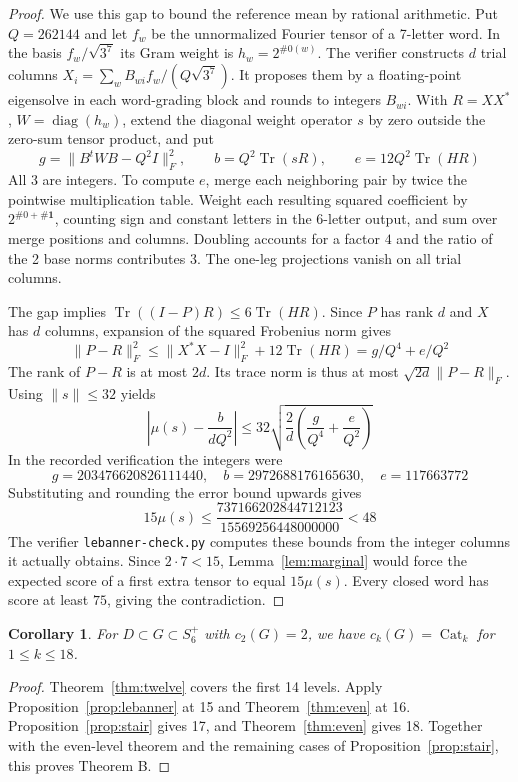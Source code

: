 \documentclass[11pt,a4paper]{amsart}
\newtheorem{corollary}[theorem]{Corollary}
\newcommand{\Cat}{\operatorname{Cat}}
\newcommand{\Tr}{\operatorname{Tr}}
\begin{document}
\begin{proof}
We use this gap to bound the reference mean by rational arithmetic. Put $Q=262144$ and let $f_w$ be the unnormalized Fourier tensor of a 7-letter word. In the basis $f_w/\sqrt{3^7}$ its Gram weight is $h_w=2^{\#0(w)}$. The verifier constructs $d$ trial columns $X_i=\sum_w B_{wi}f_w/(Q\sqrt{3^7})$. It proposes them by a floating-point eigensolve in each word-grading block and rounds to integers $B_{wi}$. With $R=XX^*$, $W=\operatorname{diag}(h_w)$, extend the diagonal weight operator $s$ by zero outside the zero-sum tensor product, and put
\[
 g=\|B^tWB-Q^2I\|_{F}^2,\qquad b=Q^2\Tr(sR),\qquad e=12Q^2\Tr(HR)
\]
All 3 are integers. To compute $e$, merge each neighboring pair by twice the pointwise multiplication table. Weight each resulting squared coefficient by $2^{\#0+\#\mathbf1}$, counting sign and constant letters in the 6-letter output, and sum over merge positions and columns. Doubling accounts for a factor $4$ and the ratio of the 2 base norms contributes $3$. The one-leg projections vanish on all trial columns.

The gap implies $\Tr((I-P)R)\leq6\Tr(HR)$. Since $P$ has rank $d$ and $X$ has $d$ columns, expansion of the squared Frobenius norm gives
\[
 \|P-R\|_F^2\leq\|X^*X-I\|_F^2+12\Tr(HR)=g/Q^4+e/Q^2
\]
The rank of $P-R$ is at most $2d$. Its trace norm is thus at most $\sqrt{2d}\|P-R\|_F$. Using $\|s\|\leq32$ yields
\[
 \left|\mu(s)-\frac{b}{dQ^2}\right|
 \leq32\sqrt{\frac{2}{d}\left(\frac{g}{Q^4}+\frac{e}{Q^2}\right)}
\]
In the recorded verification the integers were
\[
 g=203476620826111440,\quad b=2972688176165630,\quad e=117663772
\]
Substituting and rounding the error bound upwards gives
\[
 15\mu(s)\leq\frac{737166202844712123}{15569256448000000}<48
\]
The verifier \texttt{lebanner-check.py} computes these bounds from the integer columns it actually obtains. Since $2\cdot7<15$, Lemma~\ref{lem:marginal} would force the expected score of a first extra tensor to equal $15\mu(s)$. Every closed word has score at least $75$, giving the contradiction.
\end{proof}

\begin{corollary}\label{cor:eighteen}
For $D\subset G\subset S_6^+$ with $c_2(G)=2$, we have $c_k(G)=\Cat_k$ for $1\leq k\leq18$.
\end{corollary}
\begin{proof}
Theorem~\ref{thm:twelve} covers the first 14 levels. Apply Proposition~\ref{prop:lebanner} at 15 and Theorem~\ref{thm:even} at 16. Proposition~\ref{prop:stair} gives 17, and Theorem~\ref{thm:even} gives 18. Together with the even-level theorem and the remaining cases of Proposition~\ref{prop:stair}, this proves Theorem B.
\end{proof}
\end{document}
